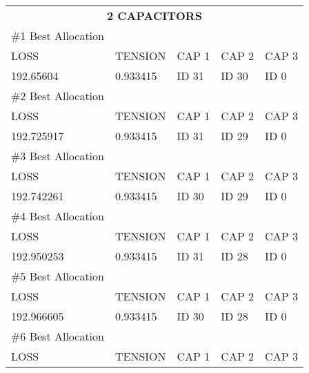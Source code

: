 \documentclass[12pt]{article}
\begin{document}
	\begin{table}[]
		\centering
		\begin{tabular}{lllll}
			\multicolumn{5}{c}{\textbf{2 CAPACITORS}}      \vspace{0.3cm}  \\ 
			\#1 Best Allocation                    &          &       &       &       \\ \hline
			LOSS                                   & TENSION  & CAP 1 & CAP 2 & CAP 3 \\
			192.65604                              & 0.933415 & ID 31 & ID 30 & ID 0  \vspace{0.3cm} \\ 
			\#2 Best Allocation                    &          &       &       &       \\ \hline
			LOSS                                   & TENSION  & CAP 1 & CAP 2 & CAP 3 \\
			192.725917                             & 0.933415 & ID 31 & ID 29 & ID 0  \vspace{0.3cm} \\ 
			\#3 Best Allocation                    &          &       &       &       \\ \hline
			LOSS                                   & TENSION  & CAP 1 & CAP 2 & CAP 3 \\
			192.742261                             & 0.933415 & ID 30 & ID 29 & ID 0  \vspace{0.3cm} \\ 
			\#4 Best Allocation                    &          &       &       &       \\ \hline
			LOSS                                   & TENSION  & CAP 1 & CAP 2 & CAP 3 \\
			192.950253                             & 0.933415 & ID 31 & ID 28 & ID 0  \vspace{0.3cm} \\ 
			\#5 Best Allocation                    &          &       &       &       \\ \hline
			LOSS                                   & TENSION  & CAP 1 & CAP 2 & CAP 3 \\
			192.966605                             & 0.933415 & ID 30 & ID 28 & ID 0  \vspace{0.3cm} \\ 
			\#6 Best Allocation                    &          &       &       &       \\ \hline
			LOSS                                   & TENSION  & CAP 1 & CAP 2 & CAP 3 \\

\end{tabular}
\end{table}
\end{document}
